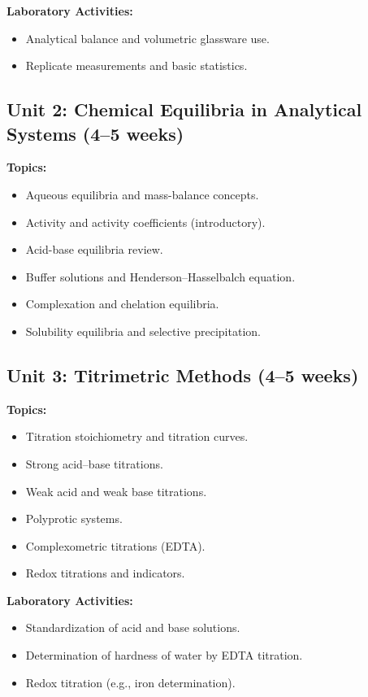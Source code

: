 \documentclass[12pt,oneside]{book}
\begin{document}
\textbf{Laboratory Activities:}
\begin{itemize}
    \item Analytical balance and volumetric glassware use.
    \item Replicate measurements and basic statistics.
\end{itemize}

\subsection{Unit 2: Chemical Equilibria in Analytical Systems (4--5 weeks)}

\textbf{Topics:}
\begin{itemize}
    \item Aqueous equilibria and mass-balance concepts.
    \item Activity and activity coefficients (introductory).
    \item Acid-base equilibria review.
    \item Buffer solutions and Henderson–Hasselbalch equation.
    \item Complexation and chelation equilibria.
    \item Solubility equilibria and selective precipitation.
\end{itemize}

\subsection{Unit 3: Titrimetric Methods (4--5 weeks)}

\textbf{Topics:}
\begin{itemize}
    \item Titration stoichiometry and titration curves.
    \item Strong acid–base titrations.
    \item Weak acid and weak base titrations.
    \item Polyprotic systems.
    \item Complexometric titrations (EDTA).
    \item Redox titrations and indicators.
\end{itemize}

\textbf{Laboratory Activities:}
\begin{itemize}
    \item Standardization of acid and base solutions.
    \item Determination of hardness of water by EDTA titration.
    \item Redox titration (e.g., iron determination).
\end{itemize}
\end{document}
